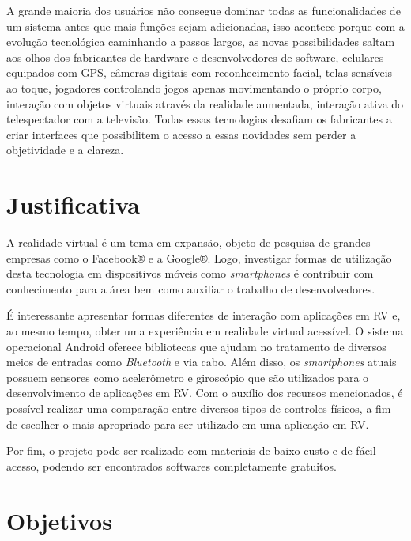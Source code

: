 \begin{citacao}
A grande maioria dos usuários não consegue dominar todas as funcionalidades de um sistema antes que mais funções sejam adicionadas, isso acontece porque com a evolução tecnológica caminhando a passos largos, as novas possibilidades saltam aos olhos dos fabricantes de hardware e desenvolvedores de software, celulares equipados com GPS, câmeras digitais com reconhecimento facial, telas sensíveis ao toque, jogadores controlando jogos apenas movimentando o próprio corpo, interação com objetos virtuais através da realidade aumentada, interação ativa do telespectador com a televisão. Todas essas tecnologias desafiam os fabricantes a criar interfaces que possibilitem o acesso a essas novidades sem perder a objetividade e a clareza. \cite{oliveira}
\end{citacao}

\section{Justificativa}
\label{s.justificativa}

A realidade virtual é um tema em expansão, objeto de pesquisa de grandes empresas como o Facebook® e a Google®. Logo, investigar formas de utilização desta tecnologia em dispositivos móveis como \textit{smartphones} é contribuir com conhecimento para a área bem como auxiliar o trabalho de desenvolvedores. 

É interessante apresentar formas diferentes de interação com aplicações em RV e, ao mesmo tempo, obter uma experiência em realidade virtual acessível. O sistema operacional Android oferece bibliotecas que ajudam no tratamento de diversos meios de entradas como \textit{Bluetooth} e via cabo. Além disso, os \textit{smartphones} atuais possuem sensores como acelerômetro e giroscópio que são utilizados para o desenvolvimento de aplicações em RV. Com o auxílio dos recursos mencionados, é possível realizar uma comparação entre diversos tipos de controles físicos, a fim de escolher o mais apropriado para ser utilizado em uma aplicação em RV. 

Por fim, o projeto pode ser realizado com materiais de baixo custo e de fácil acesso, podendo ser encontrados softwares completamente gratuitos.

\section{Objetivos}
\label{s.objetivos}

